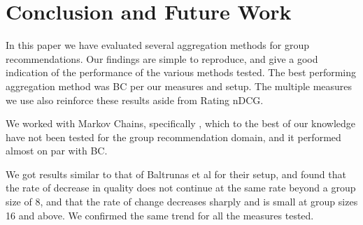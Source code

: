 \section{Conclusion and Future Work}\label{sec:conclusion}
In this paper we have evaluated several aggregation methods for group recommendations. Our findings are simple to reproduce, and give a good indication of the performance of the various methods tested. The best performing aggregation method was BC per our measures and setup. The multiple measures we use also reinforce these results aside from Rating nDCG.

We worked with Markov Chains, specifically \MC, which to the best of our knowledge have not been tested for the group recommendation domain, and it performed almost on par with BC.

We got results similar to that of Baltrunas et al for their setup, and found that the rate of decrease in quality does not continue at the same rate beyond a group size of 8, and that the rate of change decreases sharply and is small at group sizes 16 and above. We confirmed the same trend for all the measures tested.

%
%
%
%




